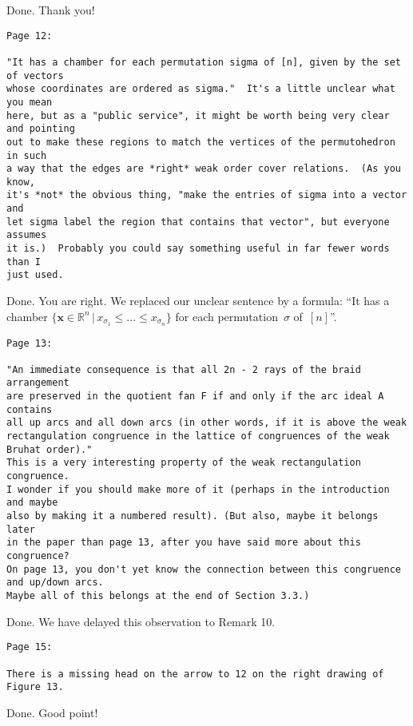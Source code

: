 \documentclass{article}
\begin{document}
Done. Thank you!

\begin{verbatim}
Page 12:

"It has a chamber for each permutation sigma of [n], given by the set of vectors 
whose coordinates are ordered as sigma."  It's a little unclear what you mean 
here, but as a "public service", it might be worth being very clear and pointing 
out to make these regions to match the vertices of the permutohedron in such 
a way that the edges are *right* weak order cover relations.  (As you know, 
it's *not* the obvious thing, "make the entries of sigma into a vector and 
let sigma label the region that contains that vector", but everyone assumes 
it is.)  Probably you could say something useful in far fewer words than I 
just used.
\end{verbatim}

Done. You are right. We replaced our unclear sentence by a formula: ``It has a chamber $\{\boldsymbol{x} \in \mathbb{R}^n \,|\, x_{\sigma_1} \le \dots \le x_{\sigma_n}\}$ for each permutation~$\sigma$ of~$[n]$''.

\begin{verbatim}
Page 13:

"An immediate consequence is that all 2n - 2 rays of the braid arrangement 
are preserved in the quotient fan F if and only if the arc ideal A contains 
all up arcs and all down arcs (in other words, if it is above the weak 
rectangulation congruence in the lattice of congruences of the weak Bruhat order)."  
This is a very interesting property of the weak rectangulation congruence.  
I wonder if you should make more of it (perhaps in the introduction and maybe 
also by making it a numbered result). (But also, maybe it belongs later 
in the paper than page 13, after you have said more about this congruence?  
On page 13, you don't yet know the connection between this congruence and up/down arcs.  
Maybe all of this belongs at the end of Section 3.3.)
\end{verbatim}

Done. We have delayed this observation to Remark 10.

\begin{verbatim}
Page 15:  

There is a missing head on the arrow to 12 on the right drawing of Figure 13.
\end{verbatim}

Done. Good point!
\end{document}
